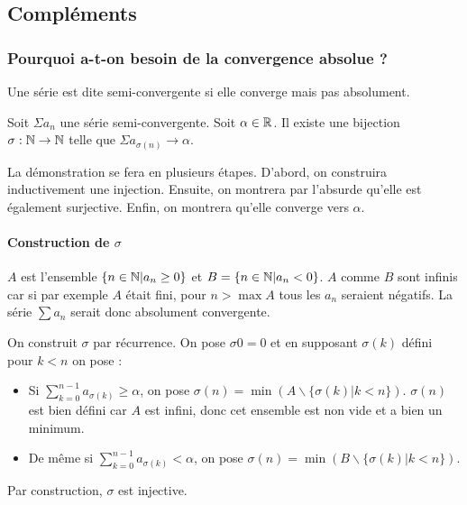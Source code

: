 \subsection{Compléments}
\subsubsection{Pourquoi a-t-on besoin de la convergence absolue ?}
\begin{defini}
    Une série est dite semi-convergente si elle converge mais pas absolument.
\end{defini}
\begin{theoreme}
    Soit $\Sigma a_n$ une série semi-convergente. Soit $\alpha \in \mathbb{R}$. Il existe une bijection $\sigma : \mathbb{N} \to \mathbb{N}$ telle que $\Sigma a_{\sigma(n)}  \to \alpha$.
\end{theoreme}

La démonstration se fera en plusieurs étapes. D'abord, on construira inductivement une injection. Ensuite, on montrera par l'absurde qu'elle est également surjective. Enfin, on montrera qu'elle converge vers $\alpha$.

\paragraph{Construction de $\sigma$} $A$ est l'ensemble $\{ n \in \mathbb{N} | a_n \geq 0 \}$ et $B= \{ n\in \mathbb{N} | a_n <0\}$. $A$ comme $B$ sont infinis car si par exemple $A$ était fini, pour $n > \max A$ tous les $a_n$ seraient négatifs. La série $\sum a_n$ serait donc absolument convergente.

On construit $\sigma$ par récurrence. On pose $\sigma{0}=0$ et en supposant $\sigma(k)$ défini pour $k<n$ on pose :
\begin{itemize}
    \item Si $\displaystyle\sum_{k=0}^{n-1}a_{\sigma(k)} \geq \alpha$, on pose $\sigma(n)=\min(A\backslash\{\sigma(k)|k<n\})$. $\sigma(n)$ est bien défini car $A$ est infini, donc cet ensemble est non vide et a bien un minimum.
    \item De même si $\displaystyle\sum_{k=0}^{n-1}a_{\sigma(k)} < \alpha$, on pose $\sigma(n)=\min(B\backslash\{\sigma(k)|k<n\})$.
\end{itemize}
Par construction, $\sigma$ est injective.

